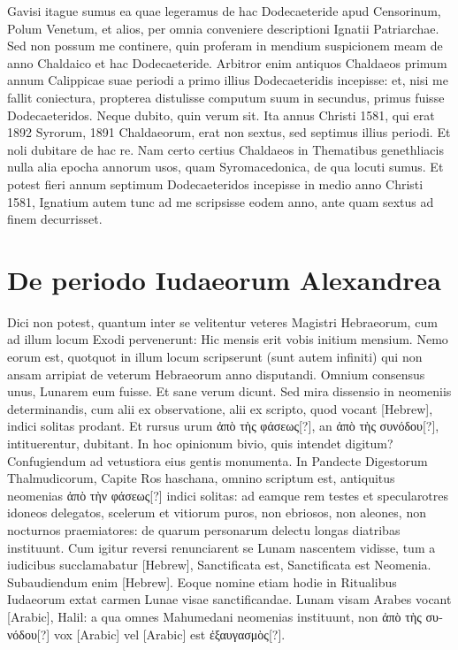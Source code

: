 Gavisi itague sumus ea quae legeramus de hac Dodecaeteride apud
Censorinum, Polum Venetum, et alios, per omnia conveniere descriptioni
Ignatii Patriarchae.
Sed non possum me continere, quin proferam
in mendium suspicionem meam de anno Chaldaico et hac Dodecaeteride.
Arbitror enim antiquos Chaldaeos primum annum
Calippicae suae periodi a primo illius Dodecaeteridis incepisse: et, nisi
me fallit coniectura, propterea distulisse computum suum in secundus,
primus fuisse Dodecaeteridos.
Neque dubito, quin verum sit.
Ita
annus Christi 1581, qui erat 1892 Syrorum, 1891 Chaldaeorum, erat
non sextus, sed septimus illius periodi.
Et noli dubitare de hac re.
Nam
certo certius Chaldaeos in Thematibus genethliacis nulla alia epocha
annorum usos, quam Syromacedonica, de qua locuti sumus.
Et potest fieri annum septimum Dodecaeteridos incepisse in medio anno
Christi 1581, Ignatium autem tunc ad me scripsisse eodem anno, ante
quam sextus ad finem decurrisset.

\section{De periodo Iudaeorum Alexandrea}
Dici non potest, quantum inter se velitentur veteres Magistri
Hebraeorum, cum ad illum locum Exodi  pervenerunt:
Hic mensis erit vobis initium mensium.
Nemo eorum est,
quotquot in illum locum scripserunt (sunt autem infiniti) qui non ansam
arripiat de veterum Hebraeorum anno disputandi.
Omnium
consensus unus, Lunarem eum fuisse.
Et sane verum dicunt.
Sed mira
dissensio in neomeniis determinandis, cum alii ex observatione, alii ex
scripto, quod vocant \texthebrew{[Hebrew]}, indici solitas prodant.
Et rursus urum
\textgreek{ἀπὸ τὴς φάσεως[?]}, an \textgreek{ἀπὸ τὴς συνόδου[?]},
 intituerentur, dubitant.
In hoc opinionum bivio, quis intendet digitum?
Confugiendum ad vetustiora
eius gentis monumenta.
In Pandecte Digestorum Thalmudicorum,
Capite Ros haschana, omnino scriptum est, antiquitus
neomenias \textgreek{ἀπὸ τὴν φάσεως[?]} indici solitas: ad eamque rem testes et
specularotres idoneos delegatos, scelerum et vitiorum puros, non
ebriosos, non aleones, non nocturnos praemiatores: de quarum personarum
delectu longas diatribas instituunt.
Cum igitur reversi renunciarent
se Lunam nascentem vidisse, tum a iudicibus succlamabatur
\texthebrew{[Hebrew]}, Sanctificata est, Sanctificata est Neomenia.
Subaudiendum
enim \texthebrew{[Hebrew]}.
Eoque nomine etiam hodie in Ritualibus Iudaeorum
extat carmen Lunae visae sanctificandae.
Lunam visam Arabes
vocant \textarabic{[Arabic]}, Halil: a qua omnes Mahumedani neomenias instituunt,
non \textgreek{ἀπὸ τὴς συνόδου[?]} vox \textarabic{[Arabic]} vel
 \textarabic{[Arabic]} est \textgreek{ἐξαυγασμὸς[?]}.

